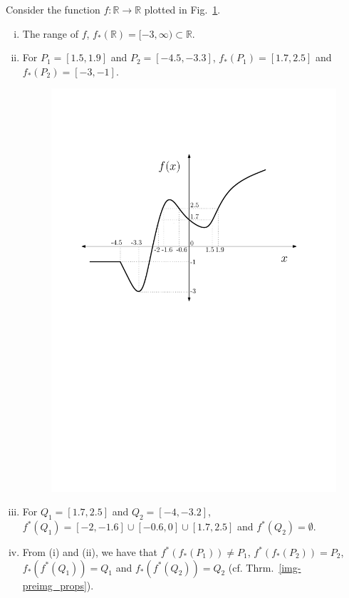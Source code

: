 \documentclass[a4paper,english,12pt]{article}
\begin{document}
\begin{exmp}
Consider the function $f:\mathbb{R}\rightarrow \mathbb{R}$ plotted in Fig.~\ref{func_ex}.\begin{enumerate}[i)]
\item The range of $f$, $f_*(\mathbb{R})=[-3,\infty)\subset \mathbb{R}$.
\item For $P_1=[1.5,1.9]$ and $P_2=[-4.5,-3.3]$, $f_*(P_1)=[1.7,2.5]$ and $f_*(P_2)=[-3,-1]$.
\begin{figure}[h]
\centering
\includegraphics[scale=0.6]{Figures/l5f2_graph.pdf}
\caption{}
\label{func_ex}
\end{figure}
\item For $Q_1=[1.7,2.5]$ and $Q_2=[-4,-3.2]$, $f^*(Q_1)= [-2,-1.6] \cup [-0.6,0] \cup [1.7,2.5]$ and $f^*(Q_2)=\emptyset$.
\item From (i) and (ii), we have that $f^*(f_*(P_1))\neq P_1$, $f^*(f_*(P_2))=P_2$, $f_*(f^*(Q_1))=Q_1$ and $f_*(f^*(Q_2))=Q_2$ (cf. Thrm.~\ref{img-preimg_props}).
\end{enumerate}
\end{exmp}
\end{document}
